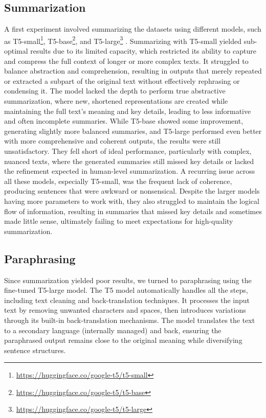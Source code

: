 \documentclass{Configuration_Files/PoliMi3i_thesis}
\begin{document}
\subsection{Summarization} \label{subsec:summarization_T1}
A first experiment involved summarizing the datasets using different models, such as T5-small\footnote{\url{https://huggingface.co/google-t5/t5-small}}, T5-base\footnote{\url{https://huggingface.co/google-t5/t5-base}}, and T5-large\footnote{\url{https://huggingface.co/google-t5/t5-large}} \cite{ni2022sentence}. Summarizing with T5-small yielded sub-optimal results due to its limited capacity, which restricted its ability to capture and compress the full context of longer or more complex texts. It struggled to balance abstraction and comprehension, resulting in outputs that merely repeated or extracted a subpart of the original text without effectively rephrasing or condensing it. The model lacked the depth to perform true abstractive summarization, where new, shortened representations are created while maintaining the full text's meaning and key details, leading to less informative and often incomplete summaries. While T5-base showed some improvement, generating slightly more balanced summaries, and T5-large performed even better with more comprehensive and coherent outputs, the results were still unsatisfactory. They fell short of ideal performance, particularly with complex, nuanced texts, where the generated summaries still missed key details or lacked the refinement expected in human-level summarization. A recurring issue across all these models, especially T5-small, was the frequent lack of coherence, producing sentences that were awkward or nonsensical. Despite the larger models having more parameters to work with, they also struggled to maintain the logical flow of information, resulting in summaries that missed key details and sometimes made little sense, ultimately failing to meet expectations for high-quality summarization.

\subsection{Paraphrasing} \label{subsec:paraphrasing_T1}
Since summarization yielded poor results, we turned to paraphrasing using the fine-tuned T5-large model. The T5 model automatically handles all the steps, including text cleaning and back-translation techniques. It processes the input text by removing unwanted characters and spaces, then introduces variations through its built-in back-translation mechanisms. The model translates the text to a secondary language (internally managed) and back, ensuring the paraphrased output remains close to the original meaning while diversifying sentence structures.
\end{document}
